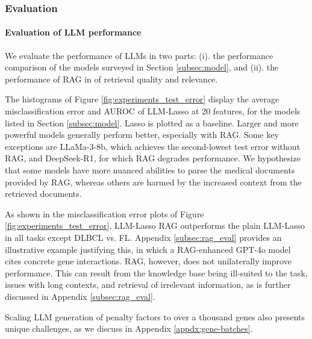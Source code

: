 \subsubsection{Evaluation}\label{sec:evaluation}
\paragraph{Evaluation of LLM performance}\label{para:LLM_perform}
We evaluate the performance of LLMs in two parts: (i). the performance comparison of the models surveyed in Section \ref{subsec:model}, and (ii). the performance of RAG in of retrieval quality and relevance.

The histograms of Figure \ref{fig:experiments_test_error} display the average misclassification error and AUROC of LLM-Lasso at 20 features, for the models listed in Section \ref{subsec:model}.
Lasso is plotted as a baseline.
Larger and more powerful models generally perform better, especially with RAG.
Some key exceptions are LLaMa-3-8b, which achieves the second-lowest test error without RAG, and DeepSeek-R1, for which RAG degrades performance. 
We hypothesize that some models have more nuanced abilities to parse the medical documents provided by RAG, whereas others are harmed by the increased context from the retrieved documents.

As shown in the misclassification error plots of Figure \ref{fig:experiments_test_error}, LLM-Lasso RAG outperforms the plain LLM-Lasso in all tasks except DLBCL vs. FL.
Appendix \ref{subsec:rag_eval} provides an illustrative example justifying this, in which a RAG-enhanced GPT-4o model cites concrete gene interactions.
RAG, however, does not unilaterally improve performance.
This can result from the knowledge base being ill-suited to the task, issues with long contexts, and retrieval of irrelevant information, as is further discussed in Appendix \ref{subsec:rag_eval}.

Scaling LLM generation of penalty factors to over a thousand genes also presents unique challenges, as we discuss in Appendix \ref{appdx:gene-batches}.
